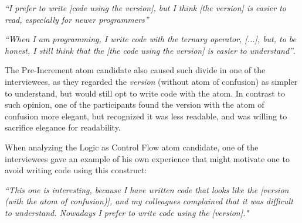 \begin{mq}
\emph{``I prefer to write [code using the \lhs version], but I think [the \rhs version]  is easier to read, especially for newer programmers''}
\end{mq}

\begin{mq}
\emph{``When I am programming, I write code with the ternary operator, [...], but, to be honest, I still think that the [the code using the \lhs version] is easier to understand''}.
\end{mq}



The Pre-Increment atom candidate also caused such
divide in one of the interviewees, as they
regarded the \emph{\rhs version} (without atom of confusion)
as simpler to understand, but would still opt to write
code with the atom. In contrast to such opinion,
one of the participants found the version with the atom
of confusion more elegant, but recognized it was less readable,
and was willing to sacrifice elegance for readability.


When analyzing the Logic as Control Flow atom candidate, one of
the interviewees gave an example of his own experience
that might motivate one to avoid writing code using this construct:

\begin{mq}
  \emph{``This one is interesting, because I have written
  code that looks like the [\lhs version (with the atom of confusion)],
  and my colleagues complained that it was difficult to understand.
  Nowadays I prefer to write code using the [\rhs version]."}
\end{mq}

